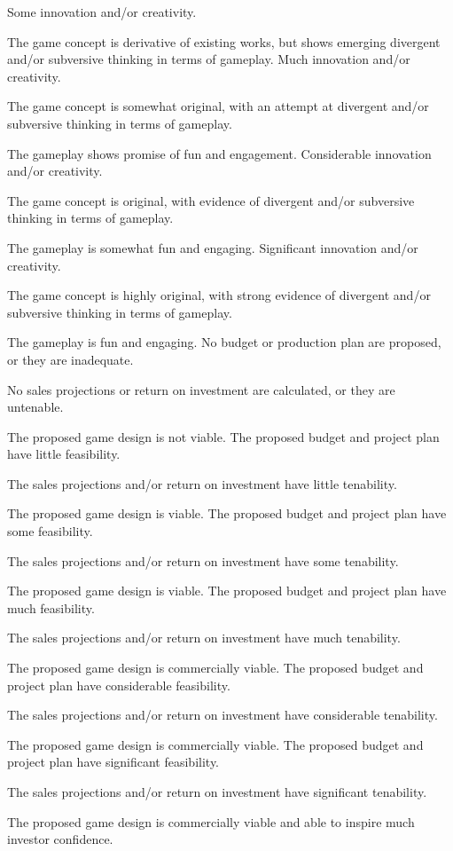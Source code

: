 \documentclass{../fal_assignment}
\begin{document}
\begin{markingrubric}
        \grade Some innovation and/or creativity.
            \par The game concept is derivative of existing works, but shows emerging divergent and/or subversive thinking in terms of gameplay.
        \grade Much innovation and/or creativity.
            \par The game concept is somewhat original, with an attempt at divergent and/or subversive thinking in terms of gameplay.
            \par The gameplay shows promise of fun and engagement.
        \grade Considerable innovation and/or creativity.
            \par The game concept is original, with evidence of divergent and/or subversive thinking in terms of gameplay.
            \par The gameplay is somewhat fun and engaging.
        \grade Significant innovation and/or creativity.
            \par The game concept is highly original, with strong evidence of divergent and/or subversive thinking in terms of gameplay.
            \par The gameplay is fun and engaging.
%
        \grade\fail No budget or production plan are proposed, or they are inadequate.
            \par No sales projections or return on investment are calculated, or they are untenable.
            \par The proposed game design is not viable.
        \grade The proposed budget and project plan have little feasibility.
            \par The sales projections and/or return on investment have little tenability.
            \par The proposed game design is viable.
        \grade The proposed budget and project plan have some feasibility.
            \par The sales projections and/or return on investment have some tenability.
            \par The proposed game design is viable.
        \grade The proposed budget and project plan have much feasibility.
            \par The sales projections and/or return on investment have much tenability.
            \par The proposed game design is commercially viable.
        \grade The proposed budget and project plan have considerable feasibility.
            \par The sales projections and/or return on investment have considerable tenability.
            \par The proposed game design is commercially viable.
        \grade The proposed budget and project plan have significant feasibility.
            \par The sales projections and/or return on investment have significant tenability.
            \par The proposed game design is commercially viable and able to inspire much investor confidence.
\end{markingrubric}
\end{document}
